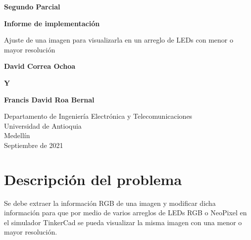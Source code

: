 \documentclass{article}
\begin{document}
	
	\begin{titlepage}
		\begin{center}
			\vspace*{1cm}
			
			\Huge
			\textbf{Segundo Parcial}
			
			\textbf{Informe de implementación}
			
			\vspace{0.5cm}
			\LARGE
			Ajuste de una imagen para visualizarla en un arreglo de LEDs con menor o mayor resolución
			
			\vspace{1.5cm}
			
			\textbf{David Correa Ochoa} 
			
			\vspace{0.8cm}
			
			\textbf{Y}
			
			\vspace{0.8cm}
			
			\textbf{Francis David Roa Bernal}
			\vfill
			
			\vspace{0.8cm}
			
			\Large
			Departamento de Ingeniería Electrónica y Telecomunicaciones\\
			Universidad de Antioquia\\
			Medellín\\
			Septiembre de 2021
			
		\end{center}
	\end{titlepage}

\tableofcontents
	\newpage
	\section{Descripción del problema}\label{intro}
	Se debe extraer la información RGB de una imagen y modificar dicha información para que por medio de varios arreglos de LEDs RGB o NeoPixel en el simulador TinkerCad se pueda visualizar la misma imagen con una menor o mayor resolución.
	
\end{document}
